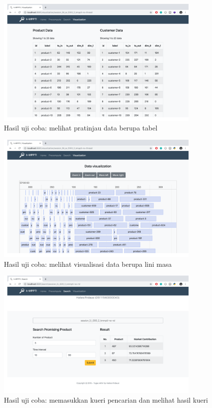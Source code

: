 \begin{figure}[H]
	\centering
	\includegraphics[width=10cm]{assets/img/bab5/hasil4.png}
	\caption{Hasil uji coba: melihat pratinjau data berupa tabel}
	\label{fig:hasil-performa4}
\end{figure}

\begin{figure}[H]
	\centering
	\includegraphics[width=10cm]{assets/img/bab5/hasil5.png}
	\caption{Hasil uji coba: melihat visualisasi data berupa lini masa}
	\label{fig:hasil-performa5}
\end{figure}

\begin{figure}[H]
	\centering
	\includegraphics[width=10cm]{assets/img/bab5/hasil6.png}
	\caption{Hasil uji coba: memasukkan kueri pencarian dan melihat hasil kueri}
	\label{fig:hasil-performa6}
\end{figure}

